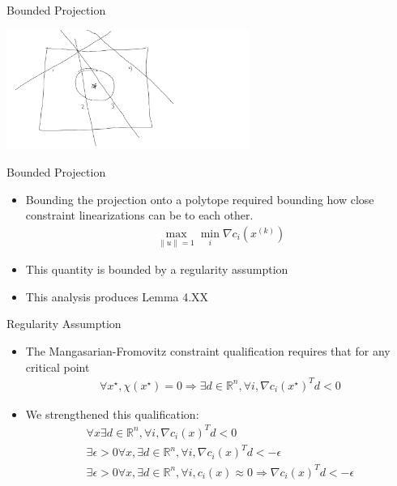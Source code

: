 \documentclass{beamer}
\newcommand{\Rn}{\mathbb R ^ {n}}
\newcommand{\xk}{{{x}^{(k)}}}
\begin{document}
\begin{frame}{Bounded Projection}
	\begin{center}
		\includegraphics[width=300px]{images/projection_cases.png}
	\end{center}
\end{frame}


\begin{frame}{Bounded Projection}
	\begin{itemize}
		\item Bounding the projection onto a polytope required bounding how close 
			constraint linearizations can be to each other.
		\begin{align*}
			\max_{\|u\| = 1} \min_i \nabla c_i\left(\xk\right)
		\end{align*}
		\item This quantity is bounded by a regularity assumption
		\item This analysis produces Lemma 4.XX
	\end{itemize}
\end{frame}



\begin{frame}{Regularity Assumption}
\begin{itemize}
\item The Mangasarian-Fromovitz constraint qualification requires that for any critical point 
\begin{align*}
\forall x^{\star}, \chi\left(x^{\star}\right) = 0 
\Longrightarrow \exists d \in \Rn, \forall i, \nabla c_i\left(x^{\star}\right)^T d < 0 
\end{align*}
\item We strengthened this qualification:
\begin{align*}
\forall x \exists d \in \Rn, \forall i, \nabla c_i\left(x\right)^T d < 0 \\
\exists \epsilon>0 \forall x, \exists d \in \Rn, \forall i, \nabla c_i\left(x\right)^T d < -\epsilon \\
\exists \epsilon>0 \forall x,\exists d\in \Rn, \forall i, c_i\left(x\right) \approx 0
\Longrightarrow \nabla c_i\left(x\right)^T d < -\epsilon \\
\end{align*}
\end{itemize}
\end{frame}
\end{document}
